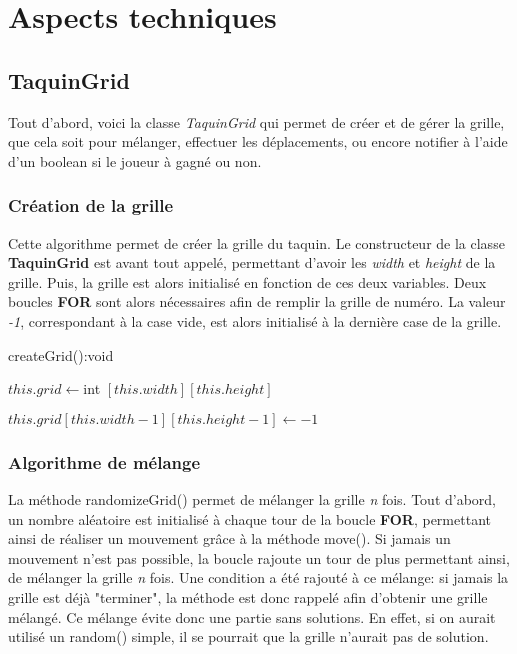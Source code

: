 \chapter{Aspects techniques}

	\section{TaquinGrid}

		Tout d'abord, voici la classe \textit{TaquinGrid} qui permet de créer et de gérer la grille, que cela soit pour mélanger, effectuer les déplacements, ou encore notifier à l'aide d'un boolean si le joueur à gagné ou non.

		\subsection{Création de la grille}

			Cette algorithme permet de créer la grille du taquin. Le constructeur de la classe \textbf{TaquinGrid} est avant tout appelé, permettant d'avoir les \textit{width} et \textit{height} de la grille. Puis, la grille est alors initialisé en fonction de ces deux variables. Deux boucles \textbf{FOR} sont alors nécessaires afin de remplir la grille de numéro. La valeur \textit{-1}, correspondant à la case vide, est alors initialisé à la dernière case de la grille.

			\begin{algorithm}[H]
				\caption{createGrid():void}
				$this.grid \leftarrow $int $[this.width][this.height]$


				$this.grid[this.width-1][this.height-1] \leftarrow -1$
			\end{algorithm}

		\subsection{Algorithme de mélange}

			La méthode randomizeGrid() permet de mélanger la grille \textit{n} fois. Tout d'abord, un nombre aléatoire est initialisé à chaque tour de la boucle \textbf{FOR}, permettant ainsi de réaliser un mouvement grâce à la méthode move(). Si jamais un mouvement n'est pas possible, la boucle rajoute un tour de plus permettant ainsi, de mélanger la grille \textit{n} fois. Une condition a été rajouté à ce mélange: si jamais la grille est déjà "terminer", la méthode est donc rappelé afin d'obtenir une grille mélangé. Ce mélange évite donc une partie sans solutions. En effet, si on aurait utilisé un random() simple, il se pourrait que la grille n'aurait pas de solution.

